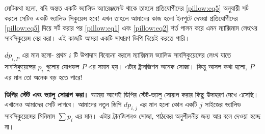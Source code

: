 \begin{solution}
মোটকথা হলো, যদি অন্তত একটি ভ্যালিড অ্যারেঞ্জমেন্ট থাকে তাহলে প্রতিযোগীদের \eqref{pillow:eq5} অনুযায়ী সর্ট করলে সেটিও একটি ভ্যালিড সিকুয়েন্স হবে! এখন তাহলে আমাদের কাজ হলো ইনপুটে দেওয়া প্রতিযোগীদের \eqref{pillow:eq5} দিয়ে সর্ট করার পর \eqref{pillow:eq1} এবং \eqref{pillow:eq2} শর্ত পালন করে এমন ম্যাক্সিমাম লেংথের সাবসিকুয়েন্স বের করা। এই কাজটি আমরা একটি সাধারণ ডিপি দিয়েই করতে পারি।

$dp_{i,P}$ এর মান হলো- প্রথম $i$ টি উপাদান বিবেচনা করলে ম্যাক্সিমাম ভ্যালিড সাবসিকুয়েন্সের লেংথ যাতে সাবসিকুয়েন্সের $p_i$ গুলোর যোগফল $P$ এর সমান হয়। এটার ট্রানজিশন অনেক সোজা। কিন্তু আসল কথা হলো, $P$ এর মান তো অনেক বড় হতে পারে!

\textbf{ডিপির স্টেট এবং ভ্যালু সোয়াপ করা।} আমরা আগেই ডিপির স্টেট-ভ্যালু সোয়াপ করার কিছু উদাহরণ দেখে এসেছি। এখানেও আমাদের সেটি লাগবে। আমাদের নতুন ডিপি $dp_{i,j}$ এর মান হলো কোন একটি $j$ সাইজের ভ্যালিড সাবসিকুয়েন্সের মিনিমাম $\sum p_i$ এর মান। এটার ট্রানজিশনও সোজা, পাঠকের অনুশীলনীর জন্য আর বলে দেওয়া হচ্ছে  না।
\end{solution}

